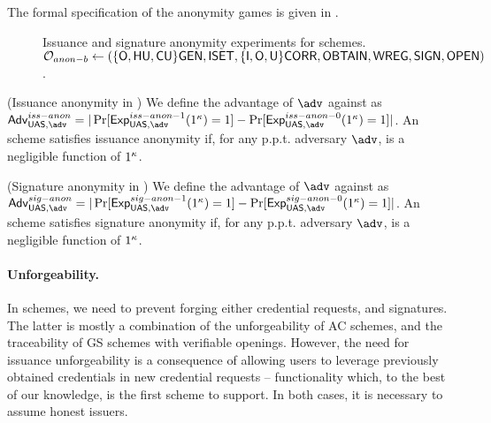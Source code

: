 The formal specification of the anonymity games is given in
.

\begin{figure*}[htp!]
  \centering
  \caption{Issuance and signature anonymity experiments for \UAS schemes.
    $\mathcal{O}_{anon-b} \gets (\lbrace\mathsf{O},\mathsf{HU},\mathsf{CU}\rbrace\mathsf{GEN},\mathsf{ISET},\lbrace\mathsf{I},
    \mathsf{O},\mathsf{U}\rbrace\mathsf{CORR},\mathsf{OBTAIN},\mathsf{WREG},\mathsf{SIGN},\mathsf{OPEN})$.}
  \label{fig:exp-uas-anonb}
\end{figure*}

\begin{definition}{(Issuance anonymity in \UAS)}
  \label{def:issue-anonymity-uas}  
  We define the advantage \AdvIssAnon of $\adv$ against \ExpIssAnonb as
  $\AdvIssAnon=|\Pr\lbrack\ExpIssAnono(1^\secpar)=1\rbrack-
  \Pr\lbrack\ExpIssAnonz(1^\secpar)=1\rbrack|$.
  An \UAS scheme satisfies issuance anonymity if, for any p.p.t. adversary
  $\adv$, \AdvIssAnon is a negligible function of $1^\kappa$.
\end{definition}

\begin{definition}{(Signature anonymity in \UAS)}
  \label{def:sign-anonymity-uas}  
  We define the advantage \AdvSigAnon of $\adv$ against \ExpSigAnonb as
  $\AdvSigAnon=|\Pr\lbrack\ExpSigAnono(1^\secpar)=1\rbrack-
  \Pr\lbrack\ExpSigAnonz(1^\secpar)=1\rbrack|$.
  An \UAS scheme satisfies signature anonymity if, for any p.p.t. adversary
  $\adv$, \AdvSigAnon is a negligible function of $1^\kappa$.
\end{definition}

\paragraph{Unforgeability.} In \UAS schemes, we need to prevent forging either
credential requests, and signatures. The latter is mostly a combination of the
unforgeability of AC schemes, and the traceability of GS schemes with verifiable
openings. However, the need for issuance unforgeability is a consequence of
allowing users to leverage previously obtained credentials in new credential
requests -- functionality which, to the best of our knowledge, \UAS is the first
scheme to support. In both cases, it is necessary to assume honest issuers. 

